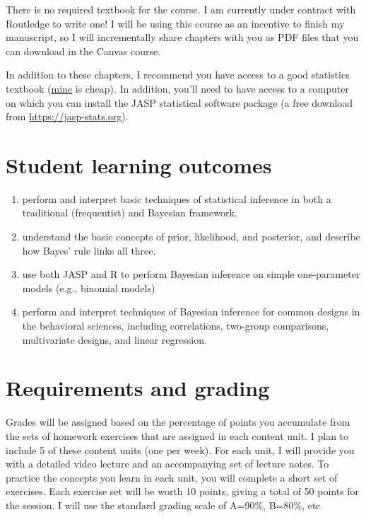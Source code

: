 \documentclass[10pt]{article}
\begin{document}
There is no required textbook for the course. I am currently under contract with Routledge to write one! I will be using this course as an incentive to finish my manuscript, so I will incrementally share chapters with you as PDF files that you can download in the Canvas course.

In addition to these chapters, I recommend you have access to a good statistics textbook (\href{https://www.amazon.com/Psychological-Statistics-Basics-Thomas-Faulkenberry-dp-1032020954/dp/1032020954}{mine} is cheap).  In addition, you'll need to have access to a computer on which you can install the JASP statistical software package (a free download from \url{https://jasp-stats.org}).

\section*{Student learning outcomes}
\label{sec:org8f23321}

\begin{enumerate}
\item perform and interpret basic techniques of statistical inference in both a traditional (frequentist) and Bayesian framework.
\item understand the basic concepts of prior, likelihood, and posterior, and describe how Bayes' rule links all three.
\item use both JASP and R to perform Bayesian inference on simple one-parameter models (e.g., binomial models)
\item perform and interpret techniques of Bayesian inference for common designs in the behavioral sciences, including correlations, two-group comparisons, multivariate designs, and linear regression.
\end{enumerate}

\section*{Requirements and grading}
\label{sec:org5827eec}

Grades will be assigned based on the percentage of points you accumulate from the sets of homework exercises that are assigned in each content unit. I plan to include 5 of these content units (one per week). For each unit, I will provide you with a detailed video lecture and an accompanying set of lecture notes. To practice the concepts you learn in each unit, you will complete a short set of exercises.  Each exercise set will be worth 10 points, giving a total of 50 points for the session. I will use the standard grading scale of A=90\%, B=80\%, etc.
\end{document}
